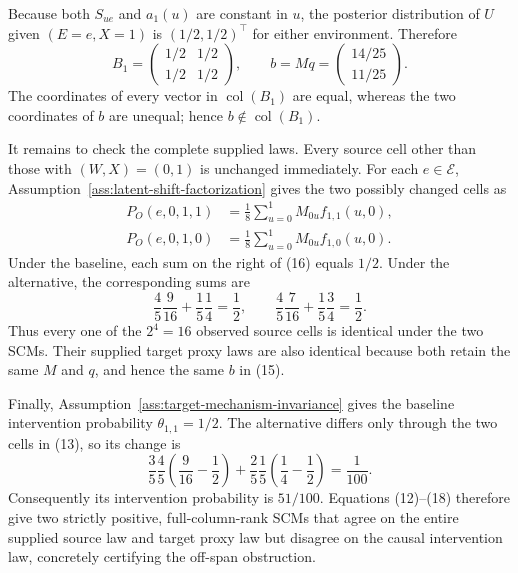 Because both \(S_{ue}\) and \(a_1(u)\) are constant in \(u\), the posterior distribution of \(U\) given \((E=e,X=1)\) is \((1/2,1/2)^{\top}\) for either environment. Therefore
\[
B_1
=\begin{pmatrix}1/2&1/2\\1/2&1/2\end{pmatrix},
\qquad
b=Mq
=\begin{pmatrix}14/25\\11/25\end{pmatrix}.
\tag{15}
\]
The coordinates of every vector in \(\operatorname{col}(B_1)\) are equal, whereas the two coordinates of \(b\) are unequal; hence \(b\notin\operatorname{col}(B_1)\).

It remains to check the complete supplied laws. Every source cell other than those with \((W,X)=(0,1)\) is unchanged immediately. For each \(e\in\mathcal E\), Assumption~\ref{ass:latent-shift-factorization} gives the two possibly changed cells as
\[
\begin{aligned}
P_O(e,0,1,1)
&=\frac18\sum_{u=0}^1M_{0u}f_{1,1}(u,0),\\
P_O(e,0,1,0)
&=\frac18\sum_{u=0}^1M_{0u}f_{1,0}(u,0).
\end{aligned}
\tag{16}
\]
Under the baseline, each sum on the right of (16) equals \(1/2\). Under the alternative, the corresponding sums are
\[
\frac45\frac9{16}+\frac15\frac14=\frac12,
\qquad
\frac45\frac7{16}+\frac15\frac34=\frac12.
\tag{17}
\]
Thus every one of the \(2^4=16\) observed source cells is identical under the two SCMs. Their supplied target proxy laws are also identical because both retain the same \(M\) and \(q\), and hence the same \(b\) in (15).

Finally, Assumption~\ref{ass:target-mechanism-invariance} gives the baseline intervention probability \(\theta_{1,1}=1/2\). The alternative differs only through the two cells in (13), so its change is
\[
\frac35\frac45\left(\frac9{16}-\frac12\right)
+\frac25\frac15\left(\frac14-\frac12\right)
=\frac1{100}.
\tag{18}
\]
Consequently its intervention probability is \(51/100\). Equations (12)--(18) therefore give two strictly positive, full-column-rank SCMs that agree on the entire supplied source law and target proxy law but disagree on the causal intervention law, concretely certifying the off-span obstruction.